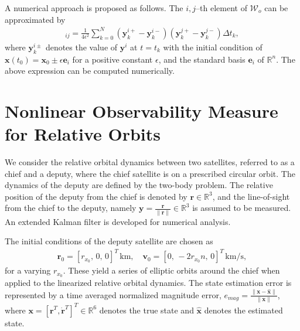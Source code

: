 \documentclass[letterpaper, preprint, paper,11pt]{AAS}	%
\newcommand{\refeqn}[1]{(\ref{eqn:#1})}
\renewcommand{\Re}{\ensuremath{\mathbb{R}}}
\newcommand{\x}{\ensuremath{\mathbf{x}}}
\newcommand{\y}{\mathbf{y}}
\begin{document}

A numerical approach is proposed as follows. The $i,j$--th element of $\mathcal{W}_o$ can be approximated by
\begin{align}
[\mathcal{W}]_{ij} = \frac{1}{4\epsilon^2}\sum_{k=0}^N (\y^{i+}_k-\y^{i-}_k)(\y^{j+}_k-\y^{j-}_k) \Delta t_k,
\end{align}
where $\y^{i\pm}_k$ denotes the value of $\y^i$ at $t=t_k$ with the initial condition of $\x(t_0)=\x_0\pm \epsilon \mathbf{e}_i $ for a positive constant $\epsilon$, and the standard basis $\mathbf{e}_i$ of $\Re^n$.  The above expression can be computed numerically.


\section{Nonlinear Observability Measure for Relative Orbits}




We consider the relative orbital dynamics between two satellites, referred to as a chief and a deputy, where the chief satellite is on a prescribed circular orbit. The dynamics of the deputy are defined by the two-body problem. The relative position of the deputy from the chief is denoted by $\mathbf{r}\in\Re^3$, and the line-of-sight from the chief to the deputy, namely $\mathbf{y}=\frac{\mathbf{r}}{\|\mathbf{r}\|}\in\Re^3$ is assumed to be measured. An extended Kalman filter is developed for numerical analysis. 

The initial conditions of the deputy satellite are chosen as
\begin{align*}
\mathbf{r}_0=[r_{x_0},\, 0,\, 0]^T\,\mathrm{km},\quad \mathbf{v}_0=[0,\, -2r_{x_0}n,\, 0]^T\,\mathrm{km/s},
\end{align*}
for a varying $r_{x_0}$. These yield a series of elliptic orbits around the chief when applied to the linearized relative orbital dynamics. The state estimation error is represented by a time averaged normalized magnitude error, $e_{mag} = \frac{\|\mathbf{x}-\hat{\mathbf{x}}\|}{\|\mathbf{x}\|}$, where $\mathbf{x}=[\mathbf{r}^T,\dot{\mathbf{r}}^T]^T\in\Re^6$ denotes the true state and $\hat{\mathbf{x}}$ denotes the estimated state. 
\end{document}
